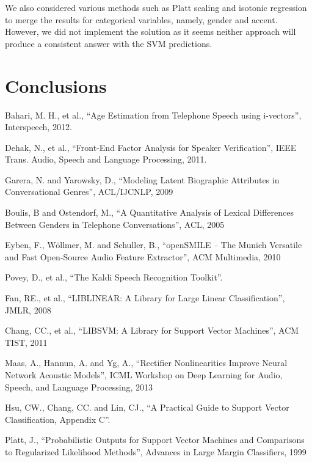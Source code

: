 \documentclass[a4paper]{article}
\begin{document}
We also considered various methods such as Platt scaling \cite{platt} and isotonic regression to merge the results for categorical variables, namely, gender and accent. However, we did not implement the solution as it seems neither approach will produce a consistent answer with the SVM predictions. 

\section{Conclusions}


\eightpt

\begin{thebibliography}{10}
 Bahari, M. H., et al., 
``Age Estimation from Telephone Speech using i-vectors'', 
Interspeech, 2012.

 Dehak, N., et al., 
``Front-End Factor Analysis for Speaker Verification'', 
IEEE Trans. Audio, Speech and Language Processing, 2011.

 Garera, N. and Yarowsky, D.,
``Modeling Latent Biographic Attributes in Conversational Genres'',
ACL/IJCNLP, 2009

 Boulis, B and Ostendorf, M.,
``A Quantitative Analysis of Lexical Differences Between Genders in Telephone Conversations'',
ACL, 2005

 Eyben, F., Wöllmer, M. and Schuller, B.,
``openSMILE – The Munich Versatile and Fast Open-Source Audio Feature Extractor'',
ACM Multimedia, 2010

 Povey, D., et al.,
``The Kaldi Speech Recognition Toolkit''.

 Fan, RE., et al.,
``LIBLINEAR: A Library for Large Linear Classification'',
JMLR, 2008

 Chang, CC., et al.,
``LIBSVM: A Library for Support Vector Machines'',
ACM TIST, 2011

 Maas, A.,  Hannun, A. and Yg, A.,
``Rectifier Nonlinearities Improve Neural Network Acoustic Models'',
ICML Workshop on Deep Learning for Audio, Speech, and Language Processing, 2013

 Hsu, CW., Chang, CC. and Lin, CJ., 
``A Practical Guide to Support Vector Classification, Appendix C''.

 Platt, J.,
``Probabilistic Outputs for Support Vector Machines and Comparisons to Regularized Likelihood Methods'',
Advances in Large Margin Classifiers, 1999

\end{thebibliography}
\end{document}
